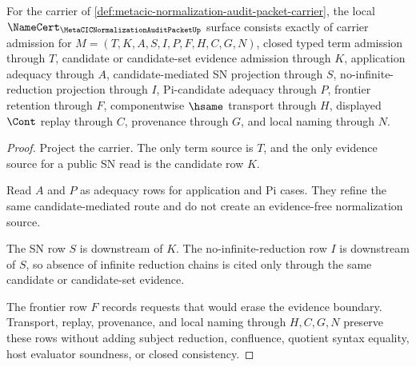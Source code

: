 \begin{theorem}
\label{thm:metacic-normalization-audit-packet-namecert-obligations}
For the carrier of \autoref{def:metacic-normalization-audit-packet-carrier}, the local $\NameCert_{\MetaCICNormalizationAuditPacketUp}$ surface consists exactly of carrier admission for $M=(T,K,A,S,I,P,F,H,C,G,N)$, closed typed term admission through $T$, candidate or candidate-set evidence admission through $K$, application adequacy through $A$, candidate-mediated SN projection through $S$, no-infinite-reduction projection through $I$, Pi-candidate adequacy through $P$, frontier retention through $F$, componentwise $\hsame$ transport through $H$, displayed $\Cont$ replay through $C$, provenance through $G$, and local naming through $N$.
\end{theorem}
\begin{proof}
Project the carrier. The only term source is $T$, and the only evidence source for a public SN read is the candidate row $K$.

Read $A$ and $P$ as adequacy rows for application and Pi cases. They refine the same candidate-mediated route and do not create an evidence-free normalization source.

The SN row $S$ is downstream of $K$. The no-infinite-reduction row $I$ is downstream of $S$, so absence of infinite reduction chains is cited only through the same candidate or candidate-set evidence.

The frontier row $F$ records requests that would erase the evidence boundary. Transport, replay, provenance, and local naming through $H,C,G,N$ preserve these rows without adding subject reduction, confluence, quotient syntax equality, host evaluator soundness, or closed consistency.
\end{proof}

